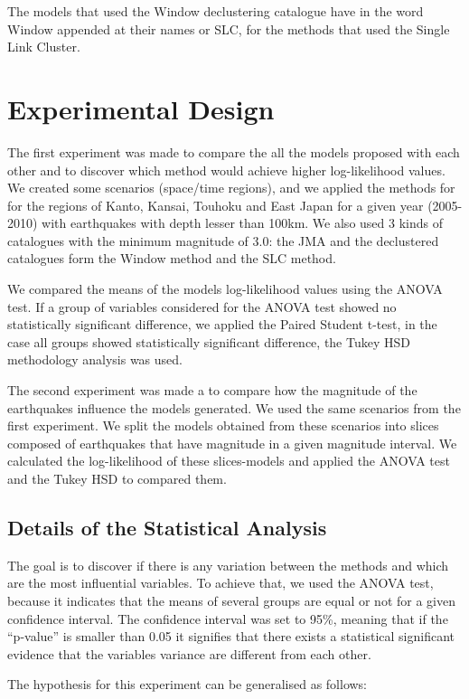 The models that used the Window declustering catalogue have in the
word Window appended at their names or SLC, for the methods that used
the Single Link Cluster.


\section{Experimental Design}
The first experiment was made to compare the all the models proposed
with each other and to discover which method would achieve higher
log-likelihood values. We created some scenarios (space/time regions),
and we applied the methods for for the regions of Kanto, Kansai,
Touhoku and East Japan for a given year (2005-2010) with earthquakes
with depth lesser than 100km. We also used 3 kinds of catalogues with
the minimum magnitude of 3.0: the JMA and the declustered catalogues
form the Window method and the SLC method.

We compared the means of the models log-likelihood values using the
ANOVA test. If a group of variables considered for the ANOVA test
showed no statistically significant difference, we applied the Paired
Student t-test, in the case all groups showed statistically
significant difference, the Tukey HSD methodology analysis was used.

The second experiment was made a to compare how the magnitude of the
earthquakes influence the models generated. We used the same scenarios
from the first experiment. We split the models obtained from these
scenarios into slices composed of earthquakes that have magnitude in a
given magnitude interval. We calculated the log-likelihood of these
slices-models and applied the ANOVA test and the Tukey HSD to compared
them.


\subsection{Details of the Statistical Analysis}\label{anova}
The goal is to discover if there is any variation between the methods
and which are the most influential variables. To achieve that, we used
the ANOVA test, because it indicates that the means of several groups
are equal or not for a given confidence interval. The confidence
interval was set to 95\%, meaning that if the ``p-value'' is smaller
than 0.05 it signifies that there exists a statistical significant
evidence that the variables variance are different from each other.

The hypothesis for this experiment can be generalised as follows:


